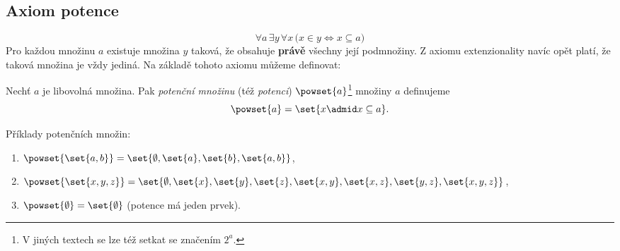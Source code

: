 \subsection{Axiom potence}
\begin{equation*}
    \forall a\,\exists y\,\forall x\,\bigl(x\in y \iff x\subseteq a\bigr)
\end{equation*}
Pro každou množinu $a$ existuje množina $y$ taková, že obsahuje \textbf{právě} všechny její podmnožiny. Z axiomu extenzionality navíc opět platí, že taková množina je vždy jediná. Na základě tohoto axiomu můžeme definovat:
\begin{definition}
    Nechť $a$ je libovolná množina. Pak \emph{potenční množinu} (též \emph{potenci}) $\powset{a}$\footnote{V jiných textech se lze též setkat se značením $2^a$.} množiny $a$ definujeme
    \begin{equation*}
        \powset{a}=\set{x \admid x\subseteq a}.
    \end{equation*}
\end{definition}
\begin{example}\label{ex:potence}
    Příklady potenčních množin:
    \begin{enumerate}[label=(\roman*)]
        \item $\powset{\set{a,b}}=\set{\emptyset,\set{a},\set{b},\set{a,b}}$,
        \item $\powset{\set{x,y,z}}=\set{\emptyset,\set{x},\set{y},\set{z},\set{x,y},\set{x,z},\set{y,z},\set{x,y,z}}$,
        \item $\powset{\emptyset}=\set{\emptyset}$ (potence má jeden prvek).
    \end{enumerate}
\end{example}

